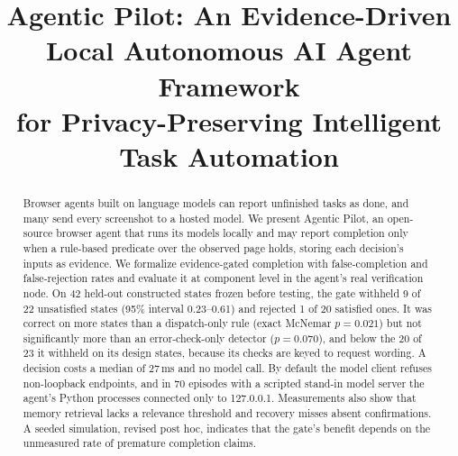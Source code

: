 \documentclass[conference]{IEEEtran}
\begin{document}

\title{Agentic Pilot: An Evidence-Driven Local Autonomous AI Agent Framework\\for Privacy-Preserving Intelligent Task Automation}

\author{
\and
{}
}

\maketitle

\begin{abstract}
Browser agents built on language models can report unfinished tasks as done, and many send every screenshot to a hosted model. We present Agentic Pilot, an open-source browser agent that runs its models locally and may report completion only when a rule-based predicate over the observed page holds, storing each decision's inputs as evidence. We formalize evidence-gated completion with false-completion and false-rejection rates and evaluate it at component level in the agent's real verification node. On 42 held-out constructed states frozen before testing, the gate withheld 9 of 22 unsatisfied states (95\% interval 0.23--0.61) and rejected 1 of 20 satisfied ones. It was correct on more states than a dispatch-only rule (exact McNemar $p=0.021$) but not significantly more than an error-check-only detector ($p=0.070$), and below the 20 of 23 it withheld on its design states, because its checks are keyed to request wording. A decision costs a median of 27\,ms and no model call. By default the model client refuses non-loopback endpoints, and in 70 episodes with a scripted stand-in model server the agent's Python processes connected only to 127.0.0.1. Measurements also show that memory retrieval lacks a relevance threshold and recovery misses absent confirmations. A seeded simulation, revised post hoc, indicates that the gate's benefit depends on the unmeasured rate of premature completion claims.
\end{abstract}
\end{document}
